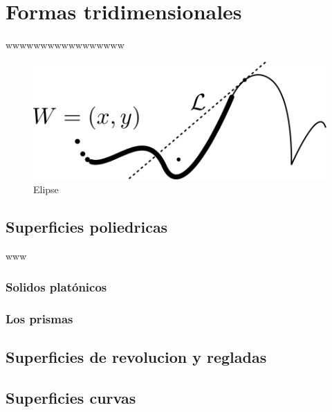 \documentclass[
  16pt,
]{krantz}
\theoremstyle{definition}
\theoremstyle{definition}
\theoremstyle{definition}
\theoremstyle{definition}
\theoremstyle{remark}
\begin{document}
\hypertarget{formas-tridimensionales}{%
\chapter{Formas tridimensionales}\label{formas-tridimensionales}}

wwwwwwwwwwwwwwwww

\begin{figure}[!ht]

{\centering \includegraphics{puntolinea} 

}

\caption{Elipse}\label{fig:pressure1}
\end{figure}

\hypertarget{superficies-poliedricas}{%
\section{Superficies poliedricas}\label{superficies-poliedricas}}

www

\hypertarget{solidos-platuxf3nicos}{%
\subsection{Solidos platónicos}\label{solidos-platuxf3nicos}}

\hypertarget{los-prismas}{%
\subsection{Los prismas}\label{los-prismas}}

\hypertarget{superficies-de-revolucion-y-regladas}{%
\section{Superficies de revolucion y regladas}\label{superficies-de-revolucion-y-regladas}}

\hypertarget{superficies-curvas}{%
\section{Superficies curvas}\label{superficies-curvas}}
\end{document}

